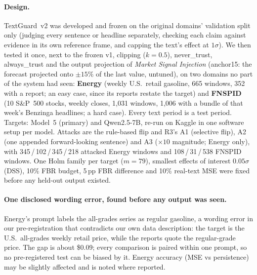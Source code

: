 \paragraph{Design.} TextGuard~v2 was developed and frozen on the original domains' validation
split only (judging every sentence or headline separately, checking each claim against evidence in
its own reference frame, and capping the text's effect at $1\sigma$). We then tested it once,
next to the frozen v1, clipping ($k = 0.5$), never\_trust, always\_trust and the output projection
of \emph{Market Signal Injection} %
(anchor15: the forecast projected onto $\pm15\%$ of the last value, untuned), on two
domains no part of the system had seen: \textbf{Energy} (weekly U.S.\ retail gasoline, 665 windows,
352 with a report; an easy case, since its reports restate the target) and \textbf{FNSPID}
(10 S\&P~500 stocks, weekly closes, 1{,}031 windows, 1{,}006 with a bundle of that week's
Benzinga headlines; a hard case). Every text period is a test period. Targets: Model~5
(primary) and Qwen2.5-7B, re-run on Kaggle in one software setup per model. Attacks are the
rule-based flip and R3's A1 (selective flip), A2 (one appended forward-looking sentence) and A3
($\times10$ magnitude; Energy only), with 345\,/\,102\,/\,345\,/\,218 attacked Energy windows and
108\,/\,31\,/\,538 FNSPID windows. One Holm family per target ($m = 79$), smallest effects of
interest $0.05\sigma$ (DSS), 10\% FBR budget, 5\,pp FBR difference and 10\% real-text MSE were
fixed before any held-out output existed.

\paragraph{One disclosed wording error, found before any output was seen.}
Energy's prompt labels the all-grades series as regular gasoline, a wording error in our
pre-registration that contradicts our own data description: the target is the U.S.\ all-grades
weekly retail price, while the reports quote the regular-grade price. The gap is about \$0.09;
every comparison is paired within one prompt, so no pre-registered test can be biased by it.
Energy accuracy (MSE vs persistence) may be slightly affected and is noted where reported.

